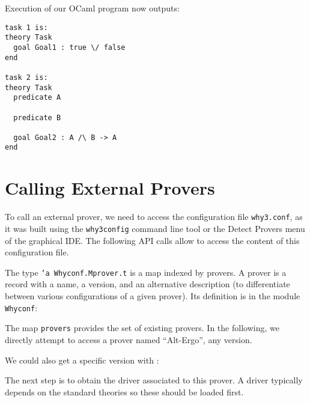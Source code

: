 Execution of our OCaml program now outputs:
\begin{verbatim}
task 1 is:
theory Task
  goal Goal1 : true \/ false
end

task 2 is:
theory Task
  predicate A

  predicate B

  goal Goal2 : A /\ B -> A
end
\end{verbatim}

\section{Calling External Provers}
\label{sec:api:callingprovers}

To call an external prover, we need to access the \why configuration
file \texttt{why3.conf}, as it was built using the \texttt{why3config}
command line tool or the \textsf{Detect Provers} menu of the graphical
IDE. The following API calls allow to access the content of this
configuration file.

The type \texttt{'a Whyconf.Mprover.t} is a map indexed by provers. A
prover is a record with a name, a version, and an alternative description
(to differentiate between various configurations of a given prover). Its
definition is in the module \texttt{Whyconf}:

The map \texttt{provers} provides the set of existing provers.
In the following, we directly
attempt to access a prover named ``Alt-Ergo'', any version.

We could also get a specific version with :


The next step is to obtain the driver associated to this prover. A
driver typically depends on the standard theories so these should be
loaded first.



